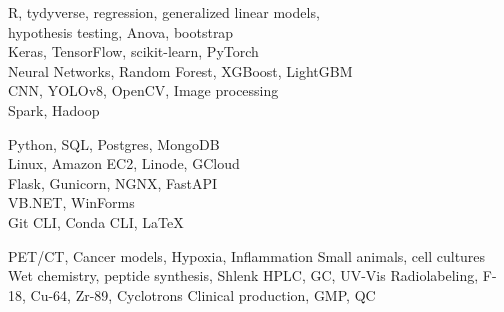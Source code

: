 \documentclass[9pt]{developercv} %
\begin{document}
\vspace{0.5cm}


\begin{minipage}[t]{0.33\textwidth} %
	\vspace{-\baselineskip} %
	
	R, tydyverse, regression, generalized linear models,\\
	hypothesis testing, Anova, bootstrap\\
	Keras, TensorFlow, scikit-learn, PyTorch\\
	Neural Networks, Random Forest, XGBoost, LightGBM\\
	CNN, YOLOv8, OpenCV, Image processing\\
	Spark, Hadoop
\end{minipage}
\hspace{0.005\textwidth}
\begin{minipage}[t]{0.33\textwidth} %
	\vspace{-\baselineskip} %
	
	Python, SQL, Postgres, MongoDB \\
	Linux, Amazon EC2, Linode, GCloud\\
	Flask, Gunicorn, NGNX, FastAPI\\
	VB.NET, WinForms\\
	Git CLI, Conda CLI, \LaTeX
\end{minipage}
\hspace{0.005\textwidth}
\begin{minipage}[t]{0.33\textwidth} %
	\vspace{-\baselineskip} %
	
	PET/CT, Cancer models, Hypoxia, Inflammation
	Small animals, cell cultures
	Wet chemistry, peptide synthesis, Shlenk
	HPLC, GC, UV-Vis
	Radiolabeling, F-18, Cu-64, Zr-89, Cyclotrons
	Clinical production, GMP, QC
\end{minipage}
\end{document}
